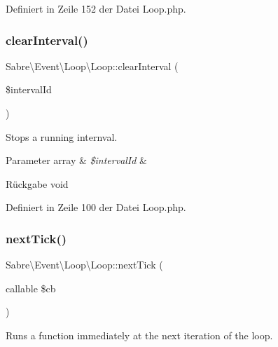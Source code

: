 Definiert in Zeile 152 der Datei Loop.\+php.

\mbox{\label{class_sabre_1_1_event_1_1_loop_1_1_loop_a688063f34dc5f12a4a6d25e529644563}} 
\subsubsection{\texorpdfstring{clear\+Interval()}{clearInterval()}}
{\footnotesize\ttfamily Sabre\textbackslash{}\+Event\textbackslash{}\+Loop\textbackslash{}\+Loop\+::clear\+Interval (\begin{DoxyParamCaption}\item[{}]{\$interval\+Id }\end{DoxyParamCaption})}

Stops a running internval.


\begin{DoxyParams}[1]{Parameter}
array & {\em \$interval\+Id} & \\
\hline
\end{DoxyParams}
\begin{DoxyReturn}{Rückgabe}
void 
\end{DoxyReturn}


Definiert in Zeile 100 der Datei Loop.\+php.

\mbox{\label{class_sabre_1_1_event_1_1_loop_1_1_loop_aa0f81262bf1101bba12dbe6abde5bb6b}} 
\subsubsection{\texorpdfstring{next\+Tick()}{nextTick()}}
{\footnotesize\ttfamily Sabre\textbackslash{}\+Event\textbackslash{}\+Loop\textbackslash{}\+Loop\+::next\+Tick (\begin{DoxyParamCaption}\item[{callable}]{\$cb }\end{DoxyParamCaption})}

Runs a function immediately at the next iteration of the loop.


